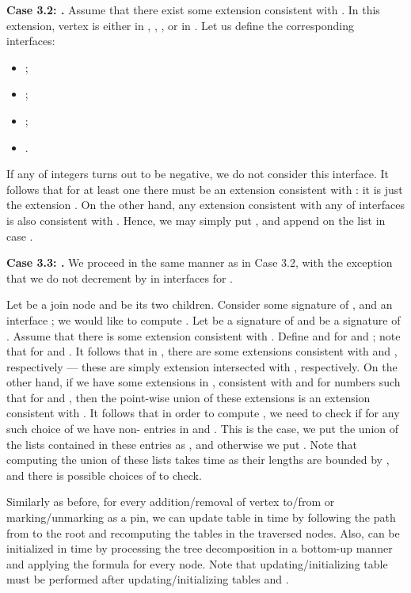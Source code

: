 \documentclass[a4paper,11pt]{article}
\theoremstyle{definition}
\theoremstyle{remark}
\begin{document}
\vskip 0.1cm {\bf{Case 3.2: .}} Assume that there exist some
extension  consistent
with .  In this extension, vertex  is either in ,
, , or in .  Let us define the
corresponding interfaces:
\begin{itemize}
\item ;
\item ;
\item ;
\item .
\end{itemize}
If any of integers  turns out to be negative,
we do not consider this interface.  It follows that for at least one
 there must be an extension
consistent with : it is just the extension .  On the other hand, any extension
consistent with any of interfaces  is
also consistent with .  Hence, we may simply put
, and append  on the list in case
.

\vskip 0.1cm {\bf{Case 3.3: .}} We proceed in the same manner
as in Case 3.2, with the exception that we do not decrement  by
 in interfaces  for .

\vskip 0.3cm

 Let  be a join node and
 be its two children.  Consider some signature
 of , and an interface
; we would like to compute
.  Let  be a signature of
 and  be a signature of .  Assume
that there is some extension  consistent with .  Define 
and  for  and ; note that
 for  and .  It follows that in
,  there are some extensions consistent with
 and
, respectively --- these are
simply extension 
intersected with , respectively.  On the other hand, if we
have some extensions in ,  consistent with
 and
 for numbers  such
that  for  and , then the
point-wise union of these extensions is an extension consistent with
.  It follows that in order to compute
, we need to check if for any such choice of  we have
non- entries in
 and
.  This is
the case, we put the union of the lists contained in these entries as
, and otherwise we put .  Note that computing the union of
these lists takes  time as their lengths are bounded by , and
there is  possible choices of  to check.

\vskip 0.3cm

Similarly as before, for every addition/removal of vertex  to/from
 or marking/unmarking  as a pin, we can update table  in
 time by following the path from
 to the root and recomputing the tables in the traversed nodes.
Also,  can be initialized in  time
by processing the tree decomposition in a bottom-up manner and
applying the formula for every node.  Note that updating/initializing
table  must be performed after updating/initializing tables 
and .
\end{document}
